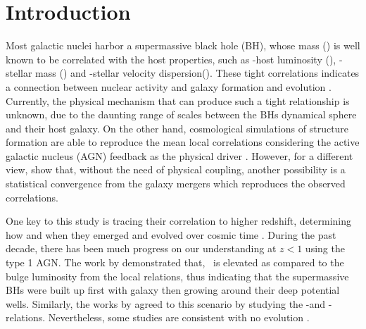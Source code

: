 \documentclass[apj]{emulateapj}
\begin{document}

\section{Introduction}
\label{sec:introduction}

Most galactic nuclei harbor a supermassive black hole (BH), whose mass (\mbh) is well known to be correlated with the host properties, such as \mbh-host luminosity (\lhost), \mbh-stellar mass (\smass) and \mbh-stellar velocity dispersion(\sigstar). These tight correlations indicates a connection between nuclear activity and galaxy formation and evolution \citep[e.g.,][]{Mag++98, F+M00, M+H03, Gul++09,Beifi2012, H+R04, Geb++01b, Gra++2011}.
Currently, the physical mechanism that can produce such a tight relationship is unknown, due to the daunting range of scales between the BHs dynamical sphere and their host galaxy. On the other hand, cosmological simulations of structure formation are able to reproduce the mean local correlations considering the active galactic nucleus (AGN) feedback as the physical driver \citep{Springel2005, Hopkins2008, Matteo2008, DeG++15}.
However, for a different view, \citet{Peng2007, Jahnke2011, Hirschmann2010} show that, without the need of physical coupling, another possibility is a statistical convergence from the galaxy mergers which reproduces the observed correlations.

One key to this study is tracing their correlation to higher redshift, determining how and when they emerged and evolved over cosmic time \citep[e.g.,][]{TMB04,Sal++06,Woo++06, Jah++09,SS13}. During the past decade, there has been much progress on our understanding at $z<1$ using the type 1 AGN. The work by \citet{Park15, Tre++07, Pen++06qsob} demonstrated that, \mbh\ is elevated as compared to the bulge luminosity from the local relations, thus indicating that the supermassive BHs were built up first with galaxy then growing around their deep potential wells. Similarly, the works by \citet{Bennert11, Woo++08} agreed to this scenario by studying the \mbh-\smass and \mbh-\sigstar relations. Nevertheless, some studies are consistent with no evolution \citet{SS13, Sun2015, Cisternas2011}.
\end{document}
